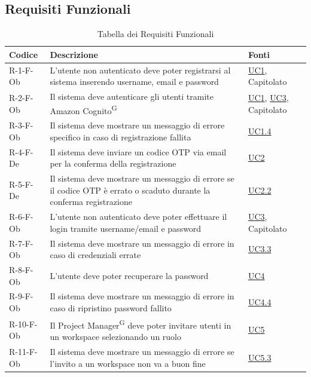 \documentclass[a4paper, 11pt]{article}
\renewcommand{\arraystretch}{1.4} %
\begin{document}
\subsection{Requisiti Funzionali}
\renewcommand{\arraystretch}{1.5}
\begin{longtable}[c]{ >{\centering\arraybackslash}m{2.5cm} >{\centering\arraybackslash}m{8.3cm} >{\centering\arraybackslash}m{3.5cm} }
    \caption{Tabella dei Requisiti Funzionali} \\
    \rowcolor{AccentDark}
    \color{white}\textbf{Codice} & \color{white}\textbf{Descrizione} & \color{white}\textbf{Fonti} \\
    \endhead

    R-1-F-Ob & L'utente non autenticato deve poter registrarsi al sistema inserendo username, email e password & \hyperref[UC1]{UC1}, Capitolato \\
    R-2-F-Ob & Il sistema deve autenticare gli utenti tramite Amazon Cognito\textsuperscript{G} & \hyperref[UC1]{UC1}, \hyperref[UC3]{UC3}, Capitolato \\
    R-3-F-Ob & Il sistema deve mostrare un messaggio di errore specifico in caso di registrazione fallita & \hyperref[UC1.4]{UC1.4} \\
    R-4-F-De & Il sistema deve inviare un codice OTP via email per la conferma della registrazione & \hyperref[UC2]{UC2} \\
    R-5-F-De & Il sistema deve mostrare un messaggio di errore se il codice OTP è errato o scaduto durante la conferma registrazione & \hyperref[UC2.2]{UC2.2} \\
    R-6-F-Ob & L'utente non autenticato deve poter effettuare il login tramite username/email e password & \hyperref[UC3]{UC3}, Capitolato \\
    R-7-F-Ob & Il sistema deve mostrare un messaggio di errore in caso di credenziali errate & \hyperref[UC3.3]{UC3.3} \\
    R-8-F-Ob & L'utente deve poter recuperare la password & \hyperref[UC4]{UC4} \\
    R-9-F-Ob & Il sistema deve mostrare un messaggio di errore in caso di ripristino password fallito & \hyperref[UC4.4]{UC4.4} \\
    R-10-F-Ob & Il Project Manager\textsuperscript{G} deve poter invitare utenti in un workspace selezionando un ruolo & \hyperref[UC5]{UC5} \\
    R-11-F-Ob & Il sistema deve mostrare un messaggio di errore se l'invito a un workspace non va a buon fine & \hyperref[UC5.3]{UC5.3} \\

\end{longtable}
\end{document}
